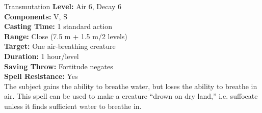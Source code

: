 {Transmutation}
{
	\textbf{Level:}
	Air 6, Decay 6\\
	\textbf{Components:}
	V, S\\
	\textbf{Casting Time:}
	1 standard action\\
	\textbf{Range:}
	Close (7.5 m + 1.5 m/2 levels)\\
	\textbf{Target:}
	One air-breathing creature\\
	\textbf{Duration:}
	1 hour/level\\
	\textbf{Saving Throw:}
	Fortitude negates\\
	\textbf{Spell Resistance:}
	Yes\\
}
{
	The subject gains the ability to breathe water, but loses the ability to breathe in air. This spell can be used to make a creature ``drown on dry land,'' i.e. suffocate unless it finds sufficient water to breathe in.
}
